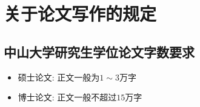 
\chapter{关于论文写作的规定}

\section{中山大学研究生学位论文字数要求}
\begin{itemize}
    \item 硕士论文: 正文一般为$1 \sim 3$万字
    \item 博士论文: 正文一般不超过$15$万字
\end{itemize}



